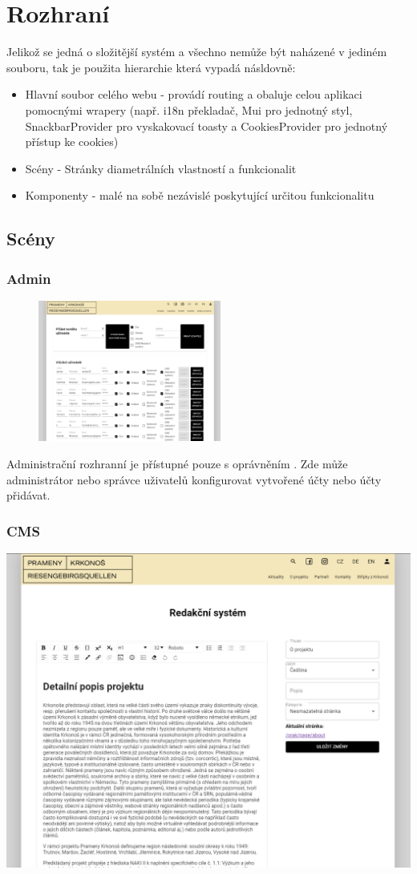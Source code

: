 \section{Rozhraní}
Jelikož se jedná o složitější systém a všechno nemůže být naházené v jediném souboru, tak 
je použita hierarchie která vypadá násldovně:
\begin{itemize}
	\item Hlavní soubor celého webu - provádí routing a obaluje celou aplikaci pomocnými wrapery
		(např. i18n překladač, Mui pro jednotný styl, SnackbarProvider
		pro vyskakovací toasty a CookiesProvider pro jednotný přístup ke cookies)
	\item Scény - Stránky diametrálních vlastností a funkcionalit
	\item Komponenty - malé na sobě nezávislé  poskytující určitou funkcionalitu
\end{itemize}
\subsection{Scény}
\subsubsection{Admin}
\begin{figure}
	\includegraphics[width=6cm]{img/adminScene.png}
\end{figure} 
Administrační rozhranní je přístupné pouze s oprávněním .
Zde může administrátor nebo správce uživatelů konfigurovat vytvořené účty nebo
účty přidávat.

\subsubsection{CMS}
\includegraphics[width=.5\textwidth]{img/cmsScene.png}

